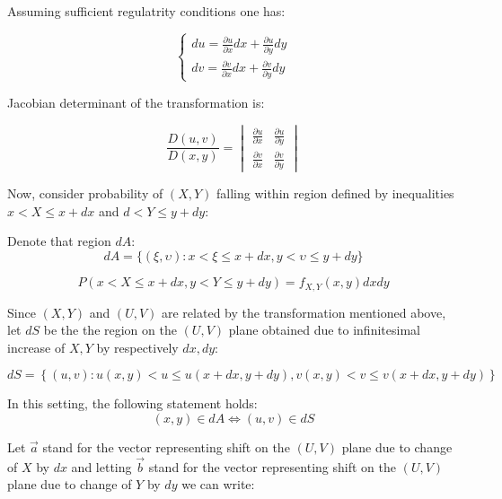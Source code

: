 \documentclass[12pt]{article}
\begin{document}
Assuming sufficient regulatrity conditions one has:

\begin{equation*}
\left\{
\begin{aligned}
du = \frac{\partial u}{\partial x}dx + \frac{\partial u}{\partial y} dy \\
dv = \frac{\partial v}{\partial x}dx + \frac{\partial v}{\partial y} dy
\end{aligned}
\right.
\end{equation*}

Jacobian determinant of the transformation is: 

\begin{equation*}
\frac{D(u,v)}{D(x, y)} = 
\begin{vmatrix}
\frac{\partial u}{\partial x} & \frac{\partial u}{\partial y} \\ 
\frac{\partial v}{\partial x} & \frac{\partial v}{\partial y}
\end{vmatrix}
\end{equation*}

Now, consider probability of $(X, Y)$ falling within region defined by inequalities
$x < X \leq x + dx$ and  $d < Y \leq y + dy$:

Denote that region $dA$:
\begin{equation*}
dA = \{ 
(\xi, \upsilon): x < \xi \leq x + dx, y < \upsilon \leq y + dy
\}
\end{equation*}

\begin{equation*}
P(x < X \leq x + dx, y < Y \leq y + dy) = f_{X, Y}(x, y) dxdy
\end{equation*}

Since $(X, Y)$ and $(U, V)$ are related by the transformation mentioned above, 
let $dS$ be the the region on the $(U, V)$ plane obtained
due to infinitesimal increase of $X, Y$ by respectively $dx, dy$:

\begin{equation*}
dS = \left\{
(u,v): 
u(x, y) < u \leq u(x + dx, y + dy), 
v(x, y) < v \leq v(x + dx, y + dy)
\right\}
\end{equation*}

In this setting, the following statement holds:
\begin{equation*}
(x, y) \in dA \Longleftrightarrow (u, v) \in dS
\end{equation*}


Let $\vec{a}$ stand for the vector representing shift on the $(U, V)$
plane due to change of $X$ by $dx$ and 
letting $\vec{b}$ stand for the vector representing shift on the $(U, V)$
plane due to change of $Y$ by $dy$ we can write:
\end{document}
